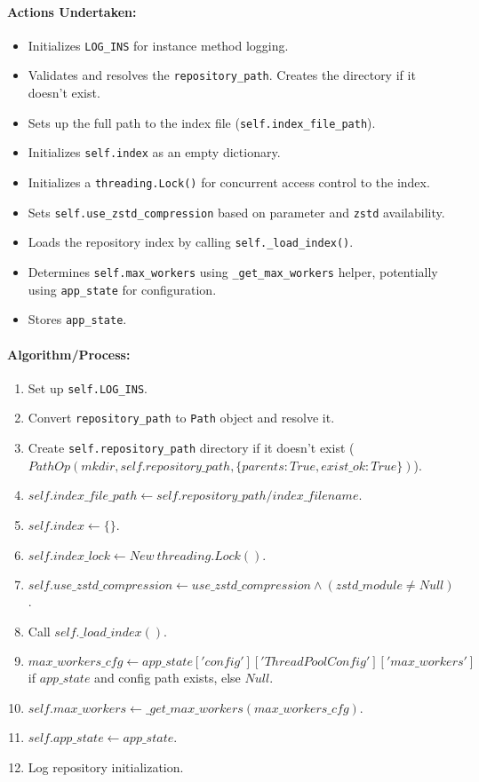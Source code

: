\documentclass{article}
\begin{document}
\paragraph{Actions Undertaken:}
\begin{itemize}
    \item Initializes \texttt{LOG\_INS} for instance method logging.
    \item Validates and resolves the \texttt{repository\_path}. Creates the directory if it doesn't exist.
    \item Sets up the full path to the index file (\texttt{self.index\_file\_path}).
    \item Initializes \texttt{self.index} as an empty dictionary.
    \item Initializes a \texttt{threading.Lock()} for concurrent access control to the index.
    \item Sets \texttt{self.use\_zstd\_compression} based on parameter and \texttt{zstd} availability.
    \item Loads the repository index by calling \texttt{self.\_load\_index()}.
    \item Determines \texttt{self.max\_workers} using \texttt{\_get\_max\_workers} helper, potentially using \texttt{app\_state} for configuration.
    \item Stores \texttt{app\_state}.
\end{itemize}
\paragraph{Algorithm/Process:}
\begin{enumerate}
    \item Set up \texttt{self.LOG\_INS}.
    \item Convert \texttt{repository\_path} to \texttt{Path} object and resolve it.
    \item Create \texttt{self.repository\_path} directory if it doesn't exist ($PathOp(mkdir, self.repository\_path, \{parents:True, exist\_ok:True\})$).
    \item $self.index\_file\_path \leftarrow self.repository\_path / index\_filename$.
    \item $self.index \leftarrow \{\}$.
    \item $self.index\_lock \leftarrow New \ threading.Lock()$.
    \item $self.use\_zstd\_compression \leftarrow use\_zstd\_compression \land (zstd\_module \neq Null)$.
    \item Call $self.\_load\_index()$.
    \item $max\_workers\_cfg \leftarrow app\_state['config']['ThreadPoolConfig']['max\_workers']$ if $app\_state$ and config path exists, else $Null$.
    \item $self.max\_workers \leftarrow \_get\_max\_workers(max\_workers\_cfg)$.
    \item $self.app\_state \leftarrow app\_state$.
    \item Log repository initialization.
\end{enumerate}
\end{document}
